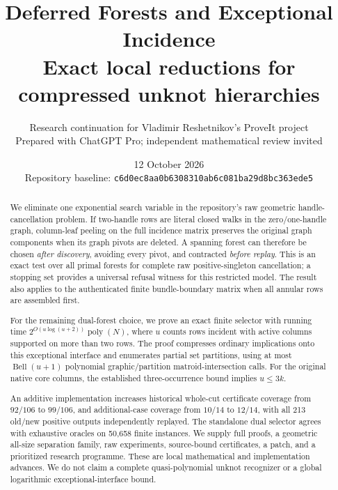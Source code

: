 \documentclass[11pt,a4paper]{article}
\title{\color{navy}\bfseries Deferred Forests and Exceptional Incidence\\[5pt]
\Large Exact local reductions for compressed unknot hierarchies}
\author{Research continuation for Vladimir Reshetnikov's ProveIt project\\[3pt]
\small Prepared with ChatGPT Pro; independent mathematical review invited}
\date{12 October 2026\\[4pt]\small Repository baseline: \texttt{c6d0ec8aa0b6308310ab6c081ba29d8bc363ede5}}
\theoremstyle{definition}
\theoremstyle{remark}
\DeclareMathOperator{\Bell}{Bell}
\begin{document}
\maketitle
\begin{abstract}
We eliminate one exponential search variable in the repository's raw
geometric handle-cancellation problem.  If two-handle rows are literal
closed walks in the zero/one-handle graph, column-leaf peeling on the full
incidence matrix preserves the original graph components when its graph
pivots are deleted.
A spanning forest can therefore be chosen \emph{after discovery}, avoiding
every pivot, and contracted \emph{before replay}.  This is an exact test
over all primal forests for complete raw positive-singleton cancellation;
a stopping set provides a universal refusal witness for this restricted
model.  The result also applies to the authenticated finite bundle-boundary
matrix when all annular rows are assembled first.

For the remaining dual-forest choice, we prove an exact finite selector
with running time $2^{O(u\log(u+2))}\operatorname{poly}(N)$, where $u$ counts
rows incident with active columns supported on more than two rows.  The
proof compresses ordinary implications onto this exceptional interface and
enumerates partial set partitions, using at most $\Bell(u+1)$ polynomial
graphic/partition matroid-intersection calls.  For the original native
core columns, the established three-occurrence bound implies $u\le3k$.

An additive implementation increases historical whole-cut certificate
coverage from $92/106$ to $99/106$, and additional-case coverage from
$10/14$ to $12/14$, with all 213 old/new positive outputs independently
replayed.  The standalone dual selector agrees with exhaustive oracles on
50,658 finite instances.  We supply full proofs, a geometric all-size
separation family, raw experiments, source-bound certificates, a patch,
and a prioritized research programme.  These are local mathematical and
implementation advances.  We do not claim a complete quasi-polynomial
unknot recognizer or a global logarithmic exceptional-interface bound.
\end{abstract}
\clearpage
\tableofcontents
\clearpage











\appendix



\end{document}
